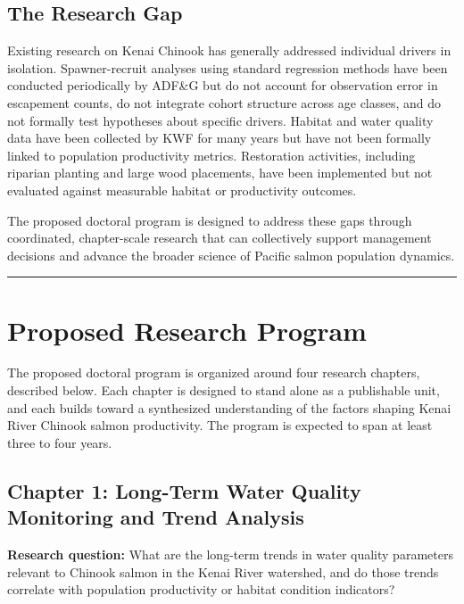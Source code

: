 \documentclass[
  letterpaper,
  DIV=11,
  numbers=noendperiod]{scrreprt}
\begin{document}
\subsection{The Research Gap}\label{the-research-gap}

Existing research on Kenai Chinook has generally addressed individual
drivers in isolation. Spawner-recruit analyses using standard regression
methods have been conducted periodically by ADF\&G but do not account
for observation error in escapement counts, do not integrate cohort
structure across age classes, and do not formally test hypotheses about
specific drivers. Habitat and water quality data have been collected by
KWF for many years but have not been formally linked to population
productivity metrics. Restoration activities, including riparian
planting and large wood placements, have been implemented but not
evaluated against measurable habitat or productivity outcomes.

The proposed doctoral program is designed to address these gaps through
coordinated, chapter-scale research that can collectively support
management decisions and advance the broader science of Pacific salmon
population dynamics.

\begin{center}\rule{0.5\linewidth}{0.5pt}\end{center}

\section{Proposed Research Program}\label{proposed-research-program}

The proposed doctoral program is organized around four research
chapters, described below. Each chapter is designed to stand alone as a
publishable unit, and each builds toward a synthesized understanding of
the factors shaping Kenai River Chinook salmon productivity. The program
is expected to span at least three to four years.

\subsection{Chapter 1: Long-Term Water Quality Monitoring and Trend
Analysis}\label{chapter-1-long-term-water-quality-monitoring-and-trend-analysis}

\textbf{Research question:} What are the long-term trends in water
quality parameters relevant to Chinook salmon in the Kenai River
watershed, and do those trends correlate with population productivity or
habitat condition indicators?
\end{document}

